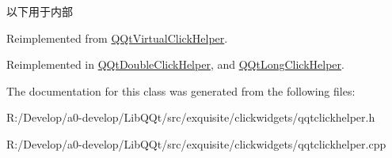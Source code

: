 以下用于内部 

Reimplemented from \mbox{\hyperlink{class_q_qt_virtual_click_helper}{Q\+Qt\+Virtual\+Click\+Helper}}.



Reimplemented in \mbox{\hyperlink{class_q_qt_double_click_helper_a42ab28dcfaf01d7e8bf8bb01bd5ca311}{Q\+Qt\+Double\+Click\+Helper}}, and \mbox{\hyperlink{class_q_qt_long_click_helper_a9cc68a8b81d6ffe142509cdb31db78b1}{Q\+Qt\+Long\+Click\+Helper}}.



The documentation for this class was generated from the following files\+:\begin{DoxyCompactItemize}
\item 
R\+:/\+Develop/a0-\/develop/\+Lib\+Q\+Qt/src/exquisite/clickwidgets/qqtclickhelper.\+h\item 
R\+:/\+Develop/a0-\/develop/\+Lib\+Q\+Qt/src/exquisite/clickwidgets/qqtclickhelper.\+cpp\end{DoxyCompactItemize}
